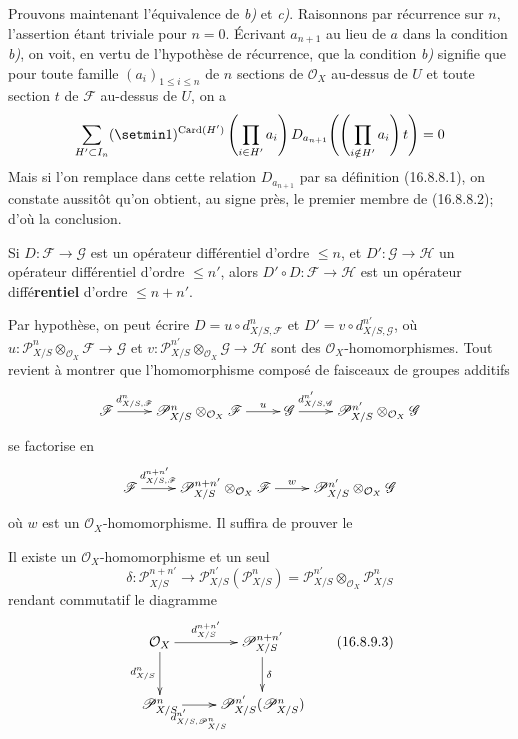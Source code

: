 Prouvons maintenant l'équivalence de \emph{b)} et \emph{c)}. Raisonnons par récurrence sur
$n$, l'assertion étant triviale pour $n=0$. Écrivant $a_{n+1}$ au lieu de $a$
dans la condition \emph{b)}, on voit, en vertu de l'hypothèse de récurrence, que la
condition \emph{b)} signifie que pour toute famille $(a_i)_{1\leq i\leq n}$ de $n$
sections de $\mathcal{O}_X$ au-dessus de $U$ et toute section $t$ de
$\mathscr{F}$ au-dessus de $U$, on a
\[
  \sum_{H'\subset I_n}(\setmin 1)^{\operatorname{Card}(H')}
  \left(\prod_{i\in H'}a_i\right)
  D_{a_{n+1}}\!\left(\left(\prod_{i\notin H'}a_i\right)t\right)=0
\]
Mais si l'on remplace dans cette relation $D_{a_{n+1}}$ par sa définition
(16.8.8.1), on constate aussitôt qu'on obtient, au signe près, le premier
membre de (16.8.8.2); d'où la conclusion.

\begin{proposition}[16.8.9]
\label{IV.16.8.9}
Si $D:\mathscr{F}\to\mathscr{G}$ est un opérateur différentiel d'ordre
$\leq n$, et $D':\mathscr{G}\to\mathscr{H}$ un opérateur différentiel d'ordre
$\leq n'$, alors $D'\circ D:\mathscr{F}\to\mathscr{H}$ est un opérateur
diffé\textbf{rentiel} d'ordre $\leq n+n'$.
\end{proposition}

Par hypothèse, on peut écrire $D=u\circ d_{X/S,\mathscr{F}}^n$ et
$D'=v\circ d_{X/S,\mathscr{G}}^{n'}$, où
$u:\mathscr{P}_{X/S}^n\otimes_{\mathcal{O}_X}\mathscr{F}\to\mathscr{G}$ et
$v:\mathscr{P}_{X/S}^{n'}\otimes_{\mathcal{O}_X}\mathscr{G}\to\mathscr{H}$
sont des $\mathcal{O}_X$-homomorphismes. Tout revient à montrer que
l'homomorphisme composé de faisceaux de groupes additifs
\[
  \xymatrix{
    \mathscr{F}\ar[r]^-{d_{X/S,\mathscr{F}}^n}
      &\mathscr{P}_{X/S}^n\otimes_{\mathcal{O}_X}\mathscr{F}
        \ar[r]^-u
      &\mathscr{G}\ar[r]^-{d_{X/S,\mathscr{G}}^{n'}}
      &\mathscr{P}_{X/S}^{n'}\otimes_{\mathcal{O}_X}\mathscr{G}
  }
\]
se factorise en
\[
  \xymatrix{
    \mathscr{F}\ar[r]^-{d_{X/S,\mathscr{F}}^{n+n'}}
      &\mathscr{P}_{X/S}^{n+n'}\otimes_{\mathcal{O}_X}\mathscr{F}
        \ar[r]^-w
      &\mathscr{P}_{X/S}^{n'}\otimes_{\mathcal{O}_X}\mathscr{G}
  }
\]
où $w$ est un $\mathcal{O}_X$-homomorphisme. Il suffira de prouver le

\begin{lemma}[16.8.9.1]
\label{IV.16.8.9.1}
Il existe un $\mathcal{O}_X$-homomorphisme et un seul
\[
  \delta:\mathscr{P}_{X/S}^{n+n'}
  \longrightarrow
  \mathscr{P}_{X/S}^{n'}(\mathscr{P}_{X/S}^n)
  =\mathscr{P}_{X/S}^{n'}\otimes_{\mathcal{O}_X}\mathscr{P}_{X/S}^n
  \tag{16.8.9.2}
  \label{IV.16.8.9.2}
\]
rendant commutatif le diagramme
\[
  \xymatrix{
    \mathcal{O}_X\ar[r]^-{d_{X/S}^{n+n'}}\ar[d]_-{d_{X/S}^n}
      &\mathscr{P}_{X/S}^{n+n'}\ar[d]^-\delta\\
    \mathscr{P}_{X/S}^n
      \ar[r]_-{d_{X/S,\mathscr{P}_{X/S}^n}^{n'}}
      &\mathscr{P}_{X/S}^{n'}(\mathscr{P}_{X/S}^n)
  }
  \tag{16.8.9.3}
  \label{IV.16.8.9.3}
\]
\end{lemma}

